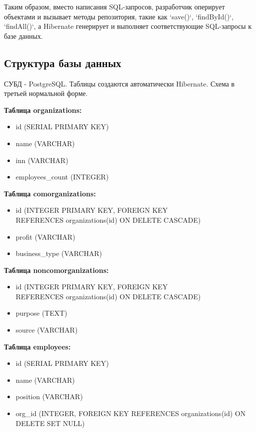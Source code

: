 \documentclass[oneside,a4paper,14pt]{extarticle}
\begin{document}
Таким образом, вместо написания SQL-запросов, разработчик оперирует объектами и вызывает методы репозитория, такие как `save()`, `findById()`, `findAll()`, а Hibernate генерирует и выполняет соответствующие SQL-запросы к базе данных.

\subsection*{Структура базы данных}

СУБД - PostgreSQL. Таблицы создаются автоматически Hibernate. Схема в третьей нормальной форме.

\textbf{Таблица organizations:}
\begin{itemize}
    \item id (SERIAL PRIMARY KEY)
    \item name (VARCHAR)
    \item inn (VARCHAR)
    \item employees\_count (INTEGER)
\end{itemize}

\textbf{Таблица comorganizations:}
\begin{itemize}
    \item id (INTEGER PRIMARY KEY, FOREIGN KEY \\REFERENCES organizations(id) ON DELETE CASCADE)
    \item profit (VARCHAR)
    \item business\_type (VARCHAR)
\end{itemize}

\textbf{Таблица noncomorganizations:}
\begin{itemize}
    \item id (INTEGER PRIMARY KEY, FOREIGN KEY \\REFERENCES organizations(id) ON DELETE CASCADE)
    \item purpose (TEXT)
    \item source (VARCHAR)
\end{itemize}

\textbf{Таблица employees:}
\begin{itemize}
    \item id (SERIAL PRIMARY KEY)
    \item name (VARCHAR)
    \item position (VARCHAR)
    \item org\_id (INTEGER, FOREIGN KEY REFERENCES organizations(id) ON DELETE SET NULL)
\end{itemize}
\end{document}
